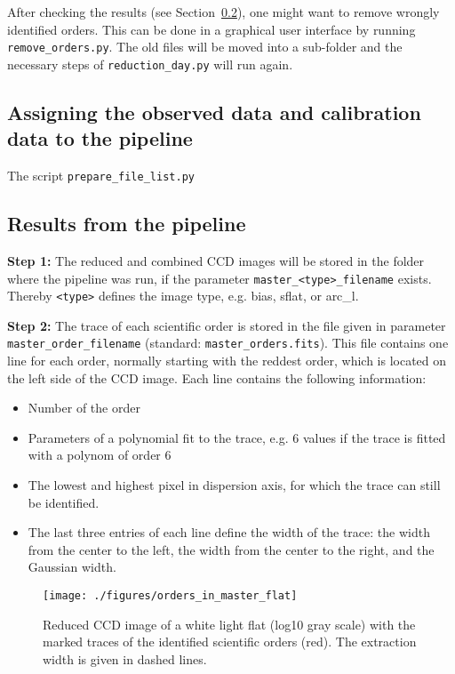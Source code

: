 \documentclass[10pt,a4paper]{article}
\begin{document}
After checking the results (see Section~\ref{section:results_pipeline}), one might want to remove wrongly identified orders. This can be done in a graphical user interface by running \verb|remove_orders.py|. The old files will be moved into a sub-folder and the necessary steps of \verb|reduction_day.py| will run again.

\subsection{Assigning the observed data and calibration data to the pipeline}
\label{Section:prepare_files}

The script \verb|prepare_file_list.py| 


\subsection{Results from the pipeline}
\label{section:results_pipeline}

\noindent \textbf{Step 1:} The reduced and combined CCD images will be stored in the folder where the pipeline was run, if the parameter \verb|master_<type>_filename| exists. Thereby \verb|<type>| defines the image type, e.g. bias, sflat, or arc\_l.

\noindent \textbf{Step 2:} The trace of each scientific order is stored in the file given in parameter \verb|master_order_filename| (standard: \verb|master_orders.fits|). This file contains one line for each order, normally starting with the reddest order, which is located on the left side of the CCD image. Each line contains the following information:
\begin{itemize}
  \item Number of the order
  \item Parameters of a polynomial fit to the trace, e.g. 6 values if the trace is fitted with a polynom of order 6
  \item The lowest and highest pixel in dispersion axis, for which the trace can still be identified.
  \item The last three entries of each line define the width of the trace: the width from the center to the left, the width from the center to the right, and the Gaussian width.
\end{itemize}
 

\begin{figure} 
  \begin{center}
    \texttt{[image: ./figures/orders\_in\_master\_flat]}
  \end{center} 
  \caption{Reduced CCD image of a white light flat (log10 gray scale) with the marked traces of the identified scientific orders (red). The extraction width is given in dashed lines.
    \label{figure_orders_in_master_flat}}
\end{figure}
\end{document}
